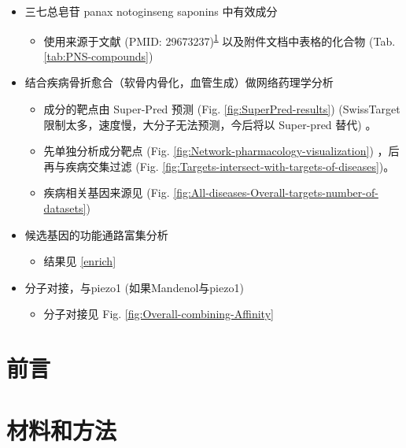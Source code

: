 \documentclass[
]{article}
\providecommand{\tightlist}{%
  \setlength{\itemsep}{0pt}\setlength{\parskip}{0pt}}
\begin{document}
\begin{itemize}
\tightlist
\item
  三七总皂苷 panax notoginseng saponins 中有效成分

  \begin{itemize}
  \tightlist
  \item
    使用来源于文献 (PMID: 29673237)\textsuperscript{\protect\hyperlink{ref-PanaxNotoginseXieW2018}{1}} 以及附件文档中表格的化合物 (Tab. \ref{tab:PNS-compounds})
  \end{itemize}
\item
  结合疾病骨折愈合（软骨内骨化，血管生成）做网络药理学分析

  \begin{itemize}
  \tightlist
  \item
    成分的靶点由 Super-Pred 预测 (Fig. \ref{fig:SuperPred-results}) (SwissTarget 限制太多，速度慢，大分子无法预测，今后将以 Super-pred 替代) 。
  \item
    先单独分析成分靶点 (Fig. \ref{fig:Network-pharmacology-visualization}) ，后再与疾病交集过滤 (Fig. \ref{fig:Targets-intersect-with-targets-of-diseases})。
  \item
    疾病相关基因来源见 (Fig. \ref{fig:All-diseases-Overall-targets-number-of-datasets})
  \end{itemize}
\item
  候选基因的功能通路富集分析

  \begin{itemize}
  \tightlist
  \item
    结果见 \ref{enrich}
  \end{itemize}
\item
  分子对接，与piezo1 (如果Mandenol与piezo1)

  \begin{itemize}
  \tightlist
  \item
    分子对接见 Fig. \ref{fig:Overall-combining-Affinity}
  \end{itemize}
\end{itemize}

\hypertarget{introduction}{%
\section{前言}\label{introduction}}

\hypertarget{methods}{%
\section{材料和方法}\label{methods}}
\end{document}
